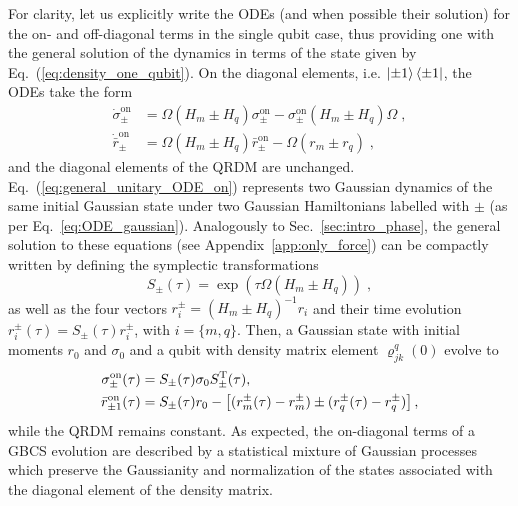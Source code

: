\documentclass[%
reprint,
superscriptaddress,
nofootinbib,
 amsmath,amssymb,
prx,
floatfix,
]{revtex4-2}
\begin{document}
For clarity, let us explicitly write the ODEs (and when possible their solution) for the on- and off-diagonal terms in the single qubit case, thus providing one with the general solution of the dynamics in terms of the state given by Eq.~(\ref{eq:density_one_qubit}). On the diagonal elements, i.e. $\ket{\pm 1}\bra{\pm 1}$,  the ODEs take the form 
\begin{align}
\label{eq:general_unitary_ODE_on}
    \dot{\sigma}^{\text{on}}_{\pm} &=  \Omega  (H_m \pm H_q)  \sigma^{\text{on}}_{\pm} -  \sigma^{\text{on}}_{\pm} ( H_m \pm H_q) \Omega   \nonumber \;,  \\ 
    \dot{\bar{r}}^{\text{on}}_{\pm} &=  \Omega  (H_m \pm H_q)   \bar{r}^{\text{on}}_{\pm} - \Omega (r_m \pm r_q) \;, 
\end{align} 
and the diagonal elements of the QRDM are unchanged. Eq.~(\ref{eq:general_unitary_ODE_on}) represents two Gaussian dynamics of the same initial Gaussian state under two Gaussian Hamiltonians labelled with $\pm$ (as per Eq.~\ref{eq:ODE_gaussian}). Analogously to Sec.~\ref{sec:intro_phase}, the general solution to these equations (see Appendix~\ref{app:only_force}) can be compactly written by defining the symplectic transformations
\begin{equation}
\label{eq:symplectic_pm}
    S_{\pm}(\tau) = \exp( \tau \Omega (H_m \pm H_q)  ) \;,
\end{equation}
as well as the four vectors $r_i^{\pm} = (H_m \pm H_q)^{-1} r_i$ and their time evolution $ r_i^{\pm} (\tau) =S_{\pm}(\tau)  r_i^{\pm}$, with $i = \{m, q\}$. Then, a Gaussian state with initial moments $r_0$ and $\sigma_0$ and a qubit with density matrix element $\varrho_{jk}^q(0)$ evolve to 
\begin{align}
\label{eq:time_diagonal_general}
    \sigma^{\text{on}}_{\pm} (\tau) &= S_\pm (\tau) \sigma_0 S^{\rm T}_\pm (\tau), \\
     \bar{r}^{\text{on}}_{\pm 1}(\tau) &=   S_\pm (\tau) r_0 - \left[ (r_m^{\pm}(\tau) - r_m^{\pm}) \pm (r_q^{\pm}(\tau) - r_q^{\pm}) \right], \nonumber 
\end{align}
while the QRDM remains constant. As expected, the on-diagonal terms of a GBCS evolution are described by a statistical mixture of Gaussian processes which preserve the Gaussianity and normalization of the states associated with the diagonal element of the density matrix. 
\end{document}
